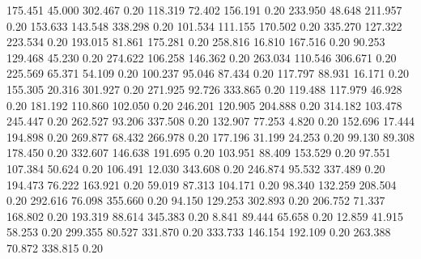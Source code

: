  175.451   45.000  302.467         0.20
 118.319   72.402  156.191         0.20
 233.950   48.648  211.957         0.20
 153.633  143.548  338.298         0.20
 101.534  111.155  170.502         0.20
 335.270  127.322  223.534         0.20
 193.015   81.861  175.281         0.20
 258.816   16.810  167.516         0.20
  90.253  129.468   45.230         0.20
 274.622  106.258  146.362         0.20
 263.034  110.546  306.671         0.20
 225.569   65.371   54.109         0.20
 100.237   95.046   87.434         0.20
 117.797   88.931   16.171         0.20
 155.305   20.316  301.927         0.20
 271.925   92.726  333.865         0.20
 119.488  117.979   46.928         0.20
 181.192  110.860  102.050         0.20
 246.201  120.905  204.888         0.20
 314.182  103.478  245.447         0.20
 262.527   93.206  337.508         0.20
 132.907   77.253    4.820         0.20
 152.696   17.444  194.898         0.20
 269.877   68.432  266.978         0.20
 177.196   31.199   24.253         0.20
  99.130   89.308  178.450         0.20
 332.607  146.638  191.695         0.20
 103.951   88.409  153.529         0.20
  97.551  107.384   50.624         0.20
 106.491   12.030  343.608         0.20
 246.874   95.532  337.489         0.20
 194.473   76.222  163.921         0.20
  59.019   87.313  104.171         0.20
  98.340  132.259  208.504         0.20
 292.616   76.098  355.660         0.20
  94.150  129.253  302.893         0.20
 206.752   71.337  168.802         0.20
 193.319   88.614  345.383         0.20
   8.841   89.444   65.658         0.20
  12.859   41.915   58.253         0.20
 299.355   80.527  331.870         0.20
 333.733  146.154  192.109         0.20
 263.388   70.872  338.815         0.20
